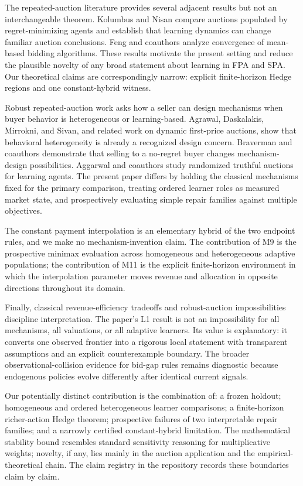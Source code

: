 \documentclass[11pt]{article}
\begin{document}
The repeated-auction literature provides several adjacent results but not an interchangeable theorem. Kolumbus and Nisan compare auctions populated by regret-minimizing agents and establish that learning dynamics can change familiar auction conclusions. Feng and coauthors analyze convergence of mean-based bidding algorithms. These results motivate the present setting and reduce the plausible novelty of any broad statement about learning in FPA and SPA. Our theoretical claims are correspondingly narrow: explicit finite-horizon Hedge regions and one constant-hybrid witness.

Robust repeated-auction work asks how a seller can design mechanisms when buyer behavior is heterogeneous or learning-based. Agrawal, Daskalakis, Mirrokni, and Sivan, and related work on dynamic first-price auctions, show that behavioral heterogeneity is already a recognized design concern. Braverman and coauthors demonstrate that selling to a no-regret buyer changes mechanism-design possibilities. Aggarwal and coauthors study randomized truthful auctions for learning agents. The present paper differs by holding the classical mechanisms fixed for the primary comparison, treating ordered learner roles as measured market state, and prospectively evaluating simple repair families against multiple objectives.

The constant payment interpolation is an elementary hybrid of the two endpoint rules, and we make no mechanism-invention claim. The contribution of M9 is the prospective minimax evaluation across homogeneous and heterogeneous adaptive populations; the contribution of M11 is the explicit finite-horizon environment in which the interpolation parameter moves revenue and allocation in opposite directions throughout its domain.

Finally, classical revenue-efficiency tradeoffs and robust-auction impossibilities discipline interpretation. The paper's L1 result is not an impossibility for all mechanisms, all valuations, or all adaptive learners. Its value is explanatory: it converts one observed frontier into a rigorous local statement with transparent assumptions and an explicit counterexample boundary. The broader observational-collision evidence for bid-gap rules remains diagnostic because endogenous policies evolve differently after identical current signals.

Our potentially distinct contribution is the combination of: a frozen holdout; homogeneous and ordered heterogeneous learner comparisons; a finite-horizon richer-action Hedge theorem; prospective failures of two interpretable repair families; and a narrowly certified constant-hybrid limitation. The mathematical stability bound resembles standard sensitivity reasoning for multiplicative weights; novelty, if any, lies mainly in the auction application and the empirical-theoretical chain. The claim registry in the repository records these boundaries claim by claim.
\end{document}
